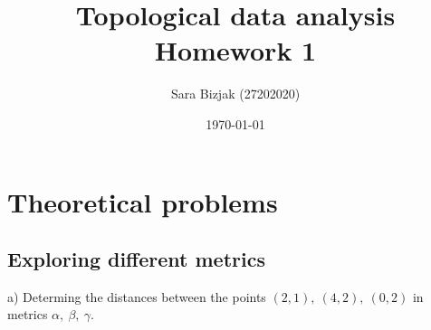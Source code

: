 \documentclass[a4paper,11pt]{article}
\title{Topological data analysis \\ Homework 1}
\author{Sara Bizjak (27202020)}
\date{\today}
\begin{document}
\maketitle

\section{Theoretical problems}
\subsection{Exploring different metrics}

\noindent
a) Determing the distances between the points $(2, 1), \ (4, 2), \ (0, 2)$ in metrics $\alpha, \  \beta, \ \gamma$.
\end{document}
